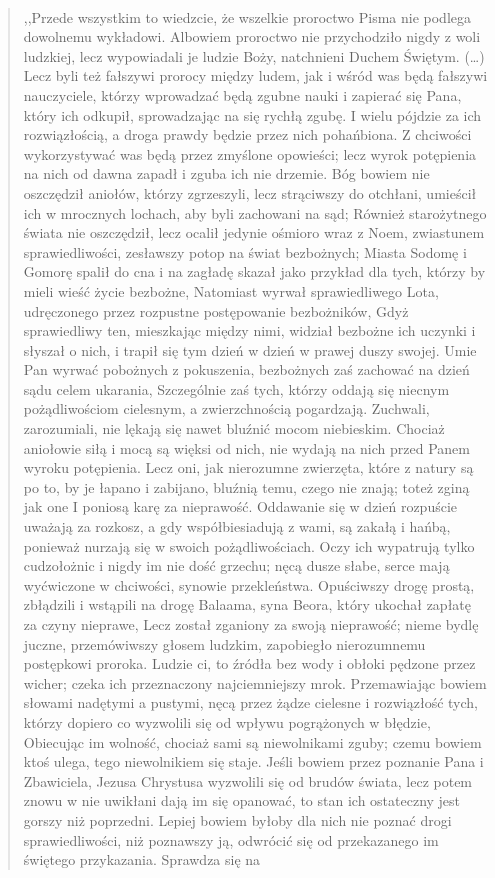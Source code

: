 \documentclass[10pt,a4paper,oneside]{article}
\begin{document}
\paragraph{}
\begin{quote}
,,Przede wszystkim to wiedzcie, że wszelkie proroctwo Pisma nie podlega dowolnemu wykładowi. Albowiem proroctwo nie przychodziło nigdy z woli ludzkiej, lecz wypowiadali je ludzie Boży, natchnieni Duchem Świętym. (\ldots) Lecz byli też fałszywi prorocy między ludem, jak i wśród was będą fałszywi nauczyciele, którzy wprowadzać będą zgubne nauki i zapierać się Pana, który ich odkupił, sprowadzając na się rychłą zgubę. I wielu pójdzie za ich rozwiązłością, a droga prawdy będzie przez nich pohańbiona. Z chciwości wykorzystywać was będą przez zmyślone opowieści; lecz wyrok potępienia na nich od dawna zapadł i zguba ich nie drzemie. Bóg bowiem nie oszczędził aniołów, którzy zgrzeszyli, lecz strąciwszy do otchłani, umieścił ich w mrocznych lochach, aby byli zachowani na sąd; Również starożytnego świata nie oszczędził, lecz ocalił jedynie ośmioro wraz z Noem, zwiastunem sprawiedliwości, zesławszy potop na świat bezbożnych; Miasta Sodomę i Gomorę spalił do cna i na zagładę skazał jako przykład dla tych, którzy by mieli wieść życie bezbożne, Natomiast wyrwał sprawiedliwego Lota, udręczonego przez rozpustne postępowanie bezbożników, Gdyż sprawiedliwy ten, mieszkając między nimi, widział bezbożne ich uczynki i słyszał o nich, i trapił się tym dzień w dzień w prawej duszy swojej. Umie Pan wyrwać pobożnych z pokuszenia, bezbożnych zaś zachować na dzień sądu celem ukarania, Szczególnie zaś tych, którzy oddają się niecnym pożądliwościom cielesnym, a zwierzchnością pogardzają. Zuchwali, zarozumiali, nie lękają się nawet bluźnić mocom niebieskim. Chociaż aniołowie siłą i mocą są więksi od nich, nie wydają na nich przed Panem wyroku potępienia. Lecz oni, jak nierozumne zwierzęta, które z natury są po to, by je łapano i zabijano, bluźnią temu, czego nie znają; toteż zginą jak one I poniosą karę za nieprawość. Oddawanie się w dzień rozpuście uważają za rozkosz, a gdy współbiesiadują z wami, są zakałą i hańbą, ponieważ nurzają się w swoich pożądliwościach. Oczy ich wypatrują tylko cudzołożnic i nigdy im nie dość grzechu; nęcą dusze słabe, serce mają wyćwiczone w chciwości, synowie przekleństwa. Opuściwszy drogę prostą, zbłądzili i wstąpili na drogę Balaama, syna Beora, który ukochał zapłatę za czyny nieprawe, Lecz został zganiony za swoją nieprawość; nieme bydlę juczne, przemówiwszy głosem ludzkim, zapobiegło nierozumnemu postępkowi proroka. Ludzie ci, to źródła bez wody i obłoki pędzone przez wicher; czeka ich przeznaczony najciemniejszy mrok. Przemawiając bowiem słowami nadętymi a pustymi, nęcą przez żądze cielesne i rozwiązłość tych, którzy dopiero co wyzwolili się od wpływu pogrążonych w błędzie, Obiecując im wolność, chociaż sami są niewolnikami zguby; czemu bowiem ktoś ulega, tego niewolnikiem się staje. Jeśli bowiem przez poznanie Pana i Zbawiciela, Jezusa Chrystusa wyzwolili się od brudów świata, lecz potem znowu w nie uwikłani dają im się opanować, to stan ich ostateczny jest gorszy niż poprzedni. Lepiej bowiem byłoby dla nich nie poznać drogi sprawiedliwości, niż poznawszy ją, odwrócić się od przekazanego im świętego przykazania. Sprawdza się na 
\end{quote}
\end{document}
